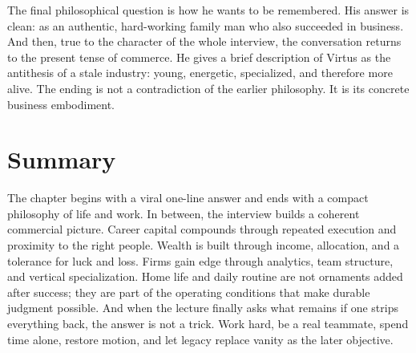 The final philosophical question is how he wants to be remembered. His answer is clean: as an authentic, hard-working family man who also succeeded in business. And then, true to the character of the whole interview, the conversation returns to the present tense of commerce. He gives a brief description of Virtus as the antithesis of a stale industry: young, energetic, specialized, and therefore more alive. The ending is not a contradiction of the earlier philosophy. It is its concrete business embodiment.

\section{Summary}

The chapter begins with a viral one-line answer and ends with a compact philosophy of life and work. In between, the interview builds a coherent commercial picture. Career capital compounds through repeated execution and proximity to the right people. Wealth is built through income, allocation, and a tolerance for luck and loss. Firms gain edge through analytics, team structure, and vertical specialization. Home life and daily routine are not ornaments added after success; they are part of the operating conditions that make durable judgment possible. And when the lecture finally asks what remains if one strips everything back, the answer is not a trick. Work hard, be a real teammate, spend time alone, restore motion, and let legacy replace vanity as the later objective.